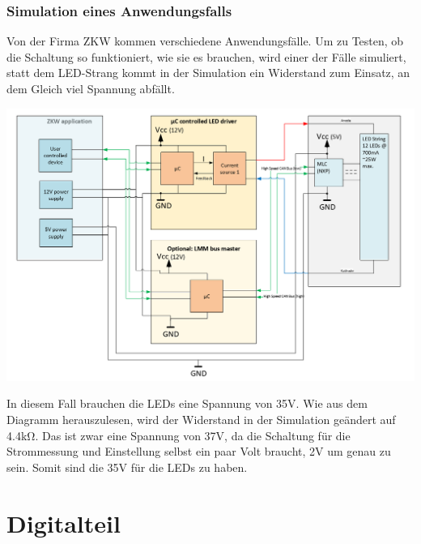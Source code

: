 \documentclass[paper=a4, 12pt]{scrreprt}
\begin{document}
			\subsubsection{Simulation eines Anwendungsfalls}\hfill \break
			Von der Firma ZKW kommen verschiedene Anwendungsfälle. Um zu Testen, ob die Schaltung so funktioniert, wie sie es brauchen, wird einer der Fälle simuliert, statt dem LED-Strang kommt in der Simulation ein Widerstand zum Einsatz, an dem Gleich viel Spannung abfällt.
			\begin{adjustbox}{center,caption={Anwendungsfall von ZKW},label={fig:anwendungsfall},nofloat=figure,vspace=\bigskipamount}
				\includegraphics[width=\textwidth]{img/SimulierterAnwendungsfall.PNG}
			\end{adjustbox}
			In diesem Fall brauchen die LEDs eine Spannung von 35V. Wie aus dem Diagramm herauszulesen, wird der Widerstand in der Simulation geändert auf 4.4kΩ. Das ist zwar eine Spannung von 37V, da die Schaltung für die Strommessung und Einstellung selbst ein paar Volt braucht, 2V um genau zu sein. Somit sind die 35V für die LEDs zu haben. 
			\newpage
			
	\section{Digitalteil}
\end{document}
